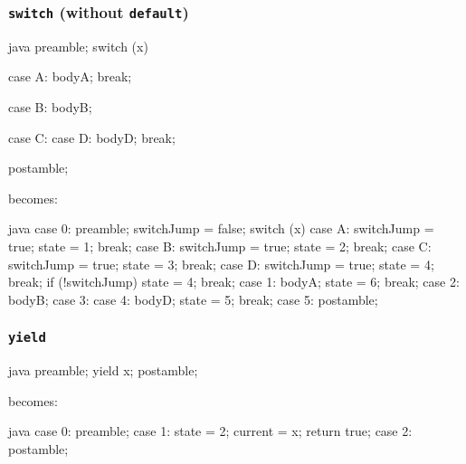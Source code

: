 \documentclass[journal,a4paper]{IEEEtran}
\begin{document}
\subsubsection{\texttt{switch} (without \texttt{default})}

\begin{pygmented}{java}
preamble;
switch (x) {
    case A:
        bodyA;
        break;

    case B:
        bodyB;

    case C:
    case D:
        bodyD;
        break;
}
postamble;
\end{pygmented}

becomes:

\begin{pygmented}{java}
case 0:
    preamble;
    switchJump = false;
    switch (x) {
        case A:
            switchJump = true;
            state = 1;
            break;
        case B:
            switchJump = true;
            state = 2;
            break;
        case C:
            switchJump = true;
            state = 3;
            break;
        case D:
            switchJump = true;
            state = 4;
            break;
    }
    if (!switchJump) {
        state = 4;
        break;
    }
case 1:
    bodyA;
    state = 6;
    break;
case 2:
    bodyB;
case 3:
case 4:
    bodyD;
    state = 5;
    break;
case 5:
    postamble;
\end{pygmented}

\subsubsection{\texttt{yield}}

\begin{pygmented}{java}
preamble;
yield x;
postamble;
\end{pygmented}

becomes:

\begin{pygmented}{java}
case 0:
    preamble;
case 1:
    state = 2;
    current = x;
    return true;
case 2:
    postamble;
\end{pygmented}
\end{document}
